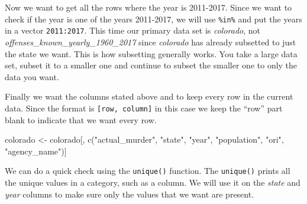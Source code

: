 \documentclass[
]{krantz}
\makeatletter
\newenvironment{Shaded}{\begin{snugshade}}{\end{snugshade}}
\newcommand{\DecValTok}[1]{\textcolor[rgb]{0.06,0.06,0.06}{#1}}
\newcommand{\FunctionTok}[1]{\textcolor[rgb]{0,0,0}{#1}}
\newcommand{\NormalTok}[1]{#1}
\newcommand{\OtherTok}[1]{\textcolor[rgb]{0.37,0.37,0.37}{#1}}
\newcommand{\SpecialCharTok}[1]{\textcolor[rgb]{0,0,0}{#1}}
\newcommand{\StringTok}[1]{\textcolor[rgb]{0.5,0.5,0.5}{#1}}
\newenvironment{kframe}{%
\medskip{}
\setlength{\fboxsep}{.8em}
 \def\at@end@of@kframe{}%
 \ifinner\ifhmode%
  \def\at@end@of@kframe{\end{minipage}}%
  \begin{minipage}{\columnwidth}%
 \fi\fi%
 \def\FrameCommand##1{\hskip\@totalleftmargin \hskip-\fboxsep
 \colorbox{shadecolor}{##1}\hskip-\fboxsep
     \hskip-\linewidth \hskip-\@totalleftmargin \hskip\columnwidth}%
 \MakeFramed {\advance\hsize-\width
   \@totalleftmargin\z@ \linewidth\hsize
   \@setminipage}}%
 {\par\unskip\endMakeFramed%
 \at@end@of@kframe}
\renewenvironment{Shaded}{\begin{kframe}}{\end{kframe}}
\makeatother
\begin{document}
\begin{Shaded}
\end{Shaded}

Now we want to get all the rows where the year is 2011-2017. Since we want to check if the year is one of the years 2011-2017, we will use \texttt{\%in\%} and put the years in a vector \texttt{2011:2017}. This time our primary data set is \emph{colorado}, not \emph{offenses\_known\_yearly\_1960\_2017} since \emph{colorado} has already subsetted to just the state we want. This is how subsetting generally works. You take a large data set, subset it to a smaller one and continue to subset the smaller one to only the data you want.

\begin{Shaded}
\end{Shaded}

Finally we want the columns stated above and to keep every row in the current data. Since the format is \texttt{{[}row,\ column{]}} in this case we keep the ``row'' part blank to indicate that we want every row.

\begin{Shaded}
\begin{Highlighting}[]
\NormalTok{colorado }\OtherTok{\textless{}{-}}\NormalTok{ colorado[, }\FunctionTok{c}\NormalTok{(}\StringTok{"actual\_murder"}\NormalTok{, }\StringTok{"state"}\NormalTok{, }\StringTok{"year"}\NormalTok{,}
  \StringTok{"population"}\NormalTok{, }\StringTok{"ori"}\NormalTok{, }\StringTok{"agency\_name"}\NormalTok{)]}
\end{Highlighting}
\end{Shaded}

We can do a quick check using the \texttt{unique()} function. The \texttt{unique()} prints all the unique values in a category, such as a column. We will use it on the \emph{state} and \emph{year} columns to make sure only the values that we want are present.
\end{document}
